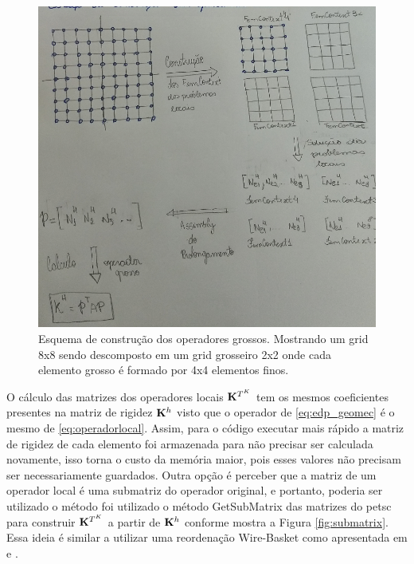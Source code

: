 \begin{figure}[!htbp]
\centering
\includegraphics[width=\textwidth]{chap07/figs/esquemaprolongamento.png}
\caption{Esquema de construção dos operadores grossos. Mostrando um grid 8x8 sendo descomposto em um grid grosseiro 2x2 onde cada elemento grosso é formado por 4x4 elementos finos.}
\label{fig:esquemaconstrucao}
\end{figure}


O cálculo das matrizes dos operadores locais $\mathbf{K}^{T^K}$ tem os mesmos coeficientes presentes na matriz de rigidez $\mathbf{K}^h$ visto que o operador de \eqref{eq:edp_geomec} é o mesmo de \eqref{eq:operadorlocal}. Assim, para o código executar mais rápido a matriz de rigidez de cada elemento foi armazenada para não precisar ser calculada novamente, isso torna o custo da memória maior, pois esses valores não precisam ser necessariamente guardados. Outra opção é perceber que a matriz de um operador local é uma submatriz do operador original, e portanto, poderia ser utilizado o método foi utilizado o método GetSubMatrix das matrizes do petsc para construir $\mathbf{K}^{T^K}$ a partir de $\mathbf{K}^h$ conforme mostra a Figura \ref{fig:submatrix}. Essa ideia é similar a utilizar uma reordenação Wire-Basket como apresentada em \cite{casteletto} e \cite{irina}.

